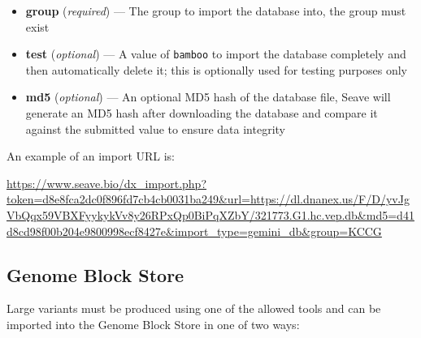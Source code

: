 \documentclass[11pt, a4paper]{article}
\begin{document}
\begin{enumerate}
\begin{itemize}
		\item \textbf{group} (\textit{required}) --- The group to import the database into, the group must exist
		\item \textbf{test} (\textit{optional}) --- A value of \texttt{bamboo} to import the database completely and then automatically delete it; this is optionally used for testing purposes only
		\item \textbf{md5} (\textit{optional}) --- An optional MD5 hash of the database file, Seave will generate an MD5 hash after downloading the database and compare it against the submitted value to ensure data integrity
	\end{itemize}
	
	An example of an import URL is:
	
	\url{https://www.seave.bio/dx_import.php?token=d8e8fca2dc0f896fd7cb4cb0031ba249&url=https://dl.dnanex.us/F/D/yvJgVbQqx59VBXFyykykVv8y26RPxQp0BiPqXZbY/321773.G1.hc.vep.db&md5=d41d8cd98f00b204e9800998ecf8427e&import_type=gemini_db&group=KCCG}
\end{enumerate}


\subsection{Genome Block Store}\label{GBSImport}

Large variants must be produced using one of the allowed tools and can be imported into the Genome Block Store in one of two ways:
\end{document}
